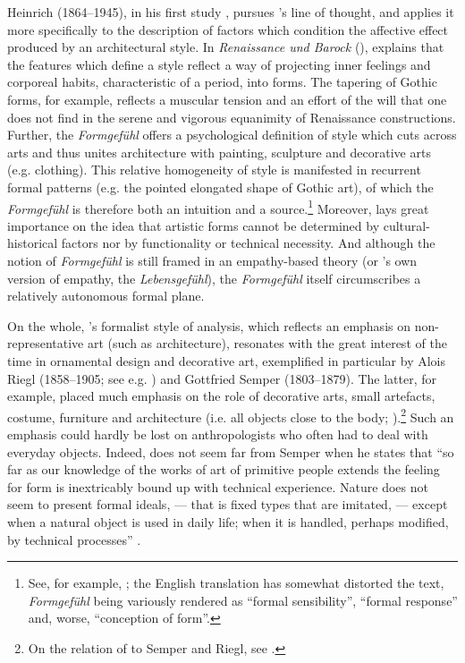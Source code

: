 \documentclass[output=paper]{langscibook}
\begin{document}
Heinrich {} (1864--1945), in his first study \citet{Wolfflin1886}, pursues {\Vischer}'s line of thought, and applies it more specifically to the description of factors which condition the affective effect produced by an architectural style. In \emph{Renaissance und Barock} (\citeyear{Wolfflin1888}), {} explains that the features which define a style reflect a way of projecting inner feelings and corporeal habits, characteristic of a period, into forms. The tapering of Gothic forms, for example, reflects a muscular tension and an effort of the will that one does not find in the serene and vigorous equanimity of Renaissance  constructions. Further, the \emph{Formgefühl} offers a psychological definition of style which cuts across arts and thus unites architecture with painting, sculpture and decorative arts (e.g. clothing). This relative homogeneity of style is manifested in recurrent formal patterns (e.g. the pointed elongated shape of Gothic art), of which the \emph{Formgefühl} is therefore both an intuition and a source.\footnote{See, for example, \citet[chap. 3]{Wolfflin1888}; the English translation has somewhat distorted the text, \emph{Formgefühl} being variously rendered as ``formal sensibility'', ``formal response'' and, worse, ``conception of form''.} Moreover, {} lays great importance on the idea that artistic forms cannot be determined by cultural-historical factors nor by functionality or technical necessity. And although the notion of \emph{Formgefühl} is still framed in an empathy-based theory (or {}'s own version of empathy, the \emph{Lebensgefühl}), the \emph{Formgefühl} itself circumscribes a relatively autonomous formal plane.

On the whole, {}'s formalist style of analysis, which reflects an emphasis on non-representative art (such as architecture), resonates with the great interest of the time in ornamental design and decorative art, exemplified in particular by Alois Riegl (1858--1905; see e.g. \citealt{Riegl1893}) and Gottfried Semper (1803--1879). The latter, for example, placed much emphasis on the role of decorative arts, small artefacts, costume, furniture and architecture (i.e. all objects close to the body; \citealt{Semper1884}).\footnote{On the relation of {} to Semper and Riegl, see \citet{Payne2012}.} Such an emphasis could hardly be lost on anthropologists who often had to deal with everyday objects. Indeed, {\Boas} does not seem far from Semper when he states that ``so far as our knowledge of the works of art of primitive people extends the feeling for form is inextricably bound up with technical experience. Nature does not seem to present formal ideals, — that is fixed types that are imitated, — except when a natural object is used in daily life; when it is handled, perhaps modified, by technical processes'' \citep[11]{Boas1927}.
\end{document}
